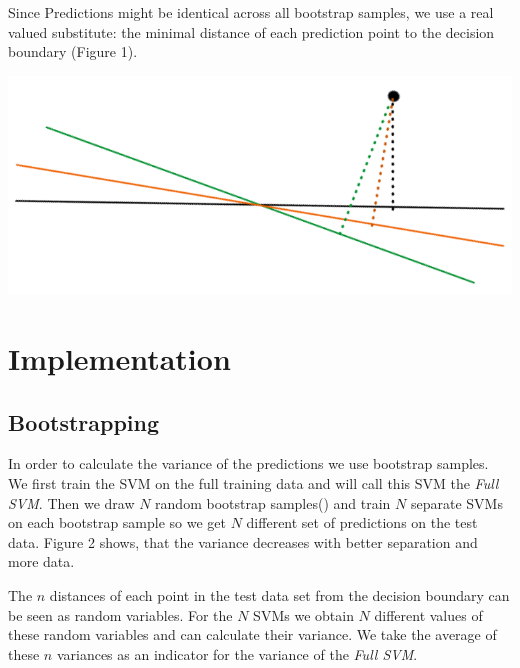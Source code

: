 \documentclass[a1,portrait]{a0poster}
\begin{document}
\begin{multicols}{3}
Since Predictions might be identical across all bootstrap samples, we use a real valued substitute: the minimal distance of each prediction point to the decision boundary (Figure 1\label{fig1}). 
\begin{center}\vspace{1cm}
\includegraphics[width=0.8\linewidth]{abb/distances.jpg}
\end{center}\vspace{1cm}


\section*{Implementation}
\subsection*{Bootstrapping}
In order to calculate the variance of the predictions we use bootstrap samples. We first train the SVM on the full training data and will call this SVM the \textit{Full SVM}. Then we draw $N$ random bootstrap samples(\cite{christmann_bootstrap_2013}) and train $N$ separate SVMs on each bootstrap sample so we get $N$ different set of predictions on the test data. Figure 2 \label{fig2} shows, that the variance decreases with better separation and more data.

The $n$ distances of each point in the test data set from the decision boundary can be seen as random variables. For the $N$ SVMs we obtain $N$ different values of these random variables and can calculate their variance. We take the average of these $n$ variances as an indicator for the variance of the \textit{Full SVM}.


\end{multicols}
\end{document}

